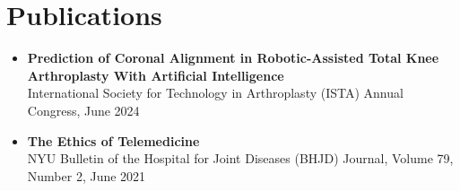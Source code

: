 \section*{Publications}
\begin{itemize}[leftmargin=*]
    \item \textbf{Prediction of Coronal Alignment in Robotic-Assisted Total Knee Arthroplasty With Artificial Intelligence} \\
    International Society for Technology in Arthroplasty (ISTA) Annual Congress, June 2024

    \item \textbf{The Ethics of Telemedicine} \\
    NYU Bulletin of the Hospital for Joint Diseases (BHJD) Journal, Volume 79, Number 2, June 2021
\end{itemize}